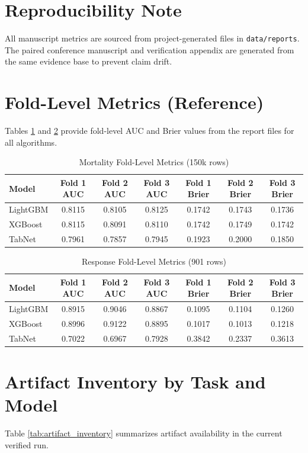 \documentclass[journal]{IEEEtran}
\begin{document}
\section*{Reproducibility Note}
All manuscript metrics are sourced from project-generated files in \texttt{data/reports}. The paired conference manuscript and verification appendix are generated from the same evidence base to prevent claim drift.

\appendices
\section{Fold-Level Metrics (Reference)}
Tables \ref{tab:mortality_fold_level} and \ref{tab:response_fold_level} provide fold-level AUC and Brier values from the report files for all algorithms.

\begin{table}[htbp]
\caption{Mortality Fold-Level Metrics (150k rows)}
\label{tab:mortality_fold_level}
\centering
\small
\begin{tabular}{lcccccc}
\toprule
Model & Fold 1 AUC & Fold 2 AUC & Fold 3 AUC & Fold 1 Brier & Fold 2 Brier & Fold 3 Brier \\
\midrule
LightGBM & 0.8115 & 0.8105 & 0.8125 & 0.1742 & 0.1743 & 0.1736 \\
XGBoost & 0.8115 & 0.8091 & 0.8110 & 0.1742 & 0.1749 & 0.1742 \\
TabNet & 0.7961 & 0.7857 & 0.7945 & 0.1923 & 0.2000 & 0.1850 \\
\bottomrule
\end{tabular}
\end{table}

\begin{table}[htbp]
\caption{Response Fold-Level Metrics (901 rows)}
\label{tab:response_fold_level}
\centering
\small
\begin{tabular}{lcccccc}
\toprule
Model & Fold 1 AUC & Fold 2 AUC & Fold 3 AUC & Fold 1 Brier & Fold 2 Brier & Fold 3 Brier \\
\midrule
LightGBM & 0.8915 & 0.9046 & 0.8867 & 0.1095 & 0.1104 & 0.1260 \\
XGBoost & 0.8996 & 0.9122 & 0.8895 & 0.1017 & 0.1013 & 0.1218 \\
TabNet & 0.7022 & 0.6967 & 0.7928 & 0.3842 & 0.2337 & 0.3613 \\
\bottomrule
\end{tabular}
\end{table}

\section{Artifact Inventory by Task and Model}
Table \ref{tab:artifact_inventory} summarizes artifact availability in the current verified run.
\end{document}
